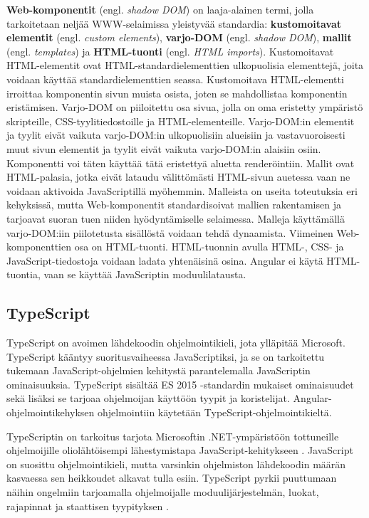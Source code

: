 \documentclass[utf8]{gradu3}
\begin{document}
\textbf{Web-komponentit} (engl. \textit{shadow DOM}) on laaja-alainen termi, jolla tarkoitetaan neljää WWW-selaimissa yleistyvää standardia: \textbf{kustomoitavat elementit} (engl. \textit{custom elements}), \textbf{varjo-DOM} (engl. \textit{shadow DOM}), \textbf{mallit} (engl. \textit{templates}) ja \textbf{HTML-tuonti} (engl. \textit{HTML imports}). Kustomoitavat HTML-elementit ovat HTML-standardielementtien ulkopuolisia elementtejä, joita voidaan käyttää standardielementtien seassa. Kustomoitava HTML-elementti irroittaa komponentin sivun muista osista, joten se mahdollistaa komponentin eristämisen. Varjo-DOM on piiloitettu osa sivua, jolla on oma eristetty ympäristö skripteille, CSS-tyylitiedostoille ja HTML-elementeille. Varjo-DOM:in elementit ja tyylit eivät vaikuta varjo-DOM:in ulkopuolisiin alueisiin ja vastavuoroisesti muut sivun elementit ja tyylit eivät vaikuta varjo-DOM:in alaisiin osiin. Komponentti voi täten käyttää tätä eristettyä aluetta renderöintiin. Mallit ovat HTML-palasia, jotka eivät lataudu välittömästi HTML-sivun auetessa vaan ne voidaan aktivoida JavaScriptillä myöhemmin. Malleista on useita toteutuksia eri kehyksissä, mutta Web-komponentit standardisoivat mallien rakentamisen ja tarjoavat suoran tuen niiden hyödyntämiselle selaimessa. Malleja käyttämällä varjo-DOM:iin piilotetusta sisällöstä voidaan tehdä dynaamista. Viimeinen Web-komponenttien osa on HTML-tuonti. HTML-tuonnin avulla HTML-, CSS- ja JavaScript-tiedostoja voidaan ladata yhtenäisinä osina. Angular ei käytä HTML-tuontia, vaan se käyttää JavaScriptin moduulilatausta. \parencite[]{angular-6-by-example}

\subsection{TypeScript}

TypeScript on avoimen lähdekoodin ohjelmointikieli, jota ylläpitää Microsoft. TypeScript kääntyy suoritusvaiheessa JavaScriptiksi, ja se on tarkoitettu tukemaan JavaScript-ohjelmien kehitystä parantelemalla JavaScriptin ominaisuuksia. TypeScript sisältää ES 2015 -standardin mukaiset ominaisuudet sekä lisäksi se tarjoaa ohjelmoijan käyttöön tyypit ja koristelijat. Angular-ohjelmointikehyksen ohjelmointiin käytetään TypeScript-ohjelmointikieltä.

TypeScriptin on tarkoitus tarjota Microsoftin .NET-ympäristöön tottuneille ohjelmoijille oliolähtöisempi lähestymistapa JavaScript-kehitykseen \parencite[]{maharry-typescript}. JavaScript on suosittu ohjelmointikieli, mutta varsinkin ohjelmiston lähdekoodin määrän kasvaessa sen heikkoudet alkavat tulla esiin. TypeScript pyrkii puuttumaan näihin ongelmiin tarjoamalla ohjelmoijalle moduulijärjestelmän, luokat, rajapinnat ja staattisen tyypityksen \parencite[]{understanding-typescript}.
\end{document}
